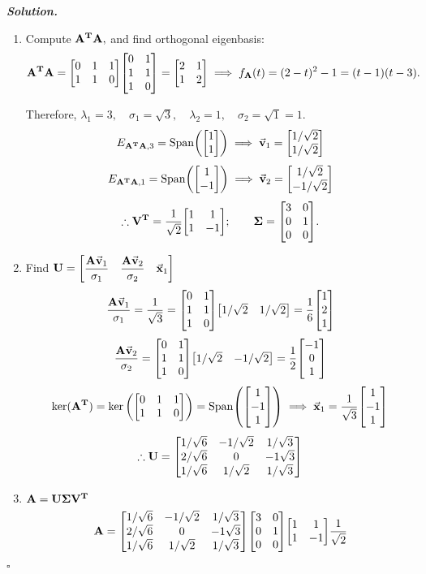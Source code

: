 \documentclass[12pt, a4paper]{article}
\newenvironment*{sol}{\par\indent\textbf{\textit{Solution. }}}{\hfill{$\square$}\par}
\def\T{{\vb{T}}}
\def\Span{\mathrm{Span}}
\def\vecx{\va{x}}
\def\vecv{\va{v}}
\def\matrixA{\vb{A}}
\def\matrixU{\vb{U}}
\def\matrixV{\vb{V}}
\def\matrixSig{\vb{\Sigma}}
\begin{document}
\begin{sol}
\begin{enumerate}
	\item Compute $\matrixA^\T\matrixA,$ and find orthogonal eigenbasis: \[\matrixA^\T\matrixA=\mqty[0&1&1\\1&1&0]\mqty[0&1\\1&1\\1&0]=\mqty[2&1\\1&2]\implies f_{\matrixA}(t)=(2-t)^2-1=(t-1)(t-3).\]\par Therefore, $\lambda_1=3,\quad\sigma_1=\sqrt{3},\quad\lambda_2=1,\quad\sigma_2=\sqrt{1}=1.$ \[E_{\matrixA^\T\matrixA,3}=\Span\qty(\mqty[1\\1])\implies\vecv_1=\mqty[1/\sqrt{2}\\1/\sqrt{2}]\] \[E_{\matrixA^\T\matrixA,1}=\Span\qty(\mqty[1\\-1])\implies\vecv_2=\mqty[1/\sqrt{2}\\-1/\sqrt{2}]\] \[\therefore\matrixV^\T=\dfrac{1}{\sqrt{2}}\mqty[1&1\\1&-1];\qquad\matrixSig=\mqty[3&0\\0&1\\0&0].\]
	\item Find $\matrixU=\mqty[\dfrac{\matrixA\vecv_1}{\sigma_1}&\dfrac{\matrixA\vecv_2}{\sigma_2}&\vecx_1]$\[\dfrac{\matrixA\vecv_1}{\sigma_1}=\dfrac{1}{\sqrt{3}}=\mqty[0&1\\1&1\\1&0]\mqty[1/\sqrt{2}&1/\sqrt{2}]=\dfrac{1}{6}\mqty[1\\2\\1]\]\[\dfrac{\matrixA\vecv_2}{\sigma_2}=\mqty[0&1\\1&1\\1&0]\mqty[1/\sqrt{2}&-1/\sqrt{2}]=\dfrac{1}{2}\mqty[-1\\0\\1]\] \[\ker(\matrixA^\T)=\ker\qty(\mqty[0&1&1\\1&1&0])=\Span\qty(\mqty[1\\-1\\1])\implies\vecx_1=\dfrac{1}{\sqrt{3}}\mqty[1\\-1\\1]\]\[\therefore\matrixU=\mqty[1/\sqrt{6}&-1/\sqrt{2}&1/\sqrt{3}\\2/\sqrt{6}&0&-1\sqrt{3}\\1/\sqrt{6}&1/\sqrt{2}&1/\sqrt{3}]\]
	\item $\matrixA=\matrixU\matrixSig\matrixV^\T$\[\matrixA=\mqty[1/\sqrt{6}&-1/\sqrt{2}&1/\sqrt{3}\\2/\sqrt{6}&0&-1\sqrt{3}\\1/\sqrt{6}&1/\sqrt{2}&1/\sqrt{3}]\mqty[3&0\\0&1\\0&0]\mqty[1&1\\1&-1]\dfrac{1}{\sqrt{2}}\]
\end{enumerate}	
\end{sol}
\end{document}
